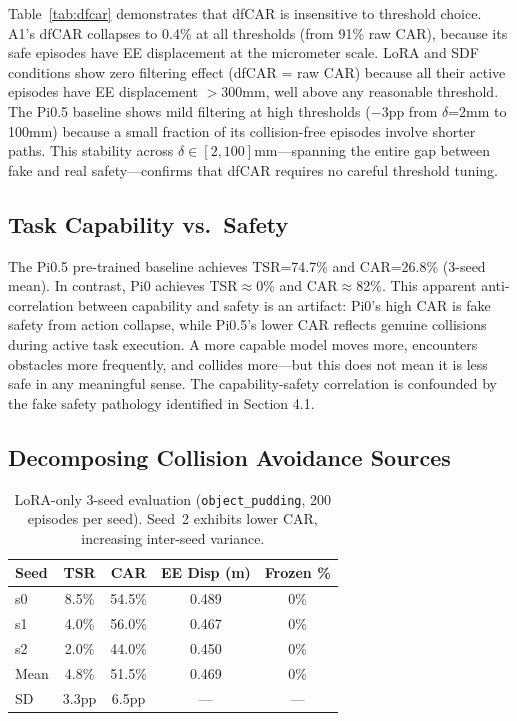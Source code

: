 \documentclass[letterpaper]{article}
\begin{document}
Table~\ref{tab:dfcar} demonstrates that dfCAR is insensitive to threshold choice. A1's dfCAR collapses to 0.4\% at all thresholds (from 91\% raw CAR), because its safe episodes have EE displacement at the micrometer scale. LoRA and SDF conditions show zero filtering effect (dfCAR = raw CAR) because all their active episodes have EE displacement $>300$mm, well above any reasonable threshold. The Pi0.5 baseline shows mild filtering at high thresholds ($-3$pp from $\delta$=2mm to 100mm) because a small fraction of its collision-free episodes involve shorter paths. This stability across $\delta \in [2, 100]$mm---spanning the entire gap between fake and real safety---confirms that dfCAR requires no careful threshold tuning.


\subsection{Task Capability vs.\ Safety}

The Pi0.5 pre-trained baseline achieves TSR=74.7\% and CAR=26.8\% (3-seed mean). In contrast, Pi0 achieves TSR$\approx$0\% and CAR$\approx$82\%. This apparent anti-correlation between capability and safety is an artifact: Pi0's high CAR is fake safety from action collapse, while Pi0.5's lower CAR reflects genuine collisions during active task execution. A more capable model moves more, encounters obstacles more frequently, and collides more---but this does not mean it is less safe in any meaningful sense. The capability-safety correlation is confounded by the fake safety pathology identified in Section 4.1.


\subsection{Decomposing Collision Avoidance Sources}

\begin{table}[t]
\centering
\caption{LoRA-only 3-seed evaluation (\texttt{object\_pudding}, 200 episodes per seed). Seed~2 exhibits lower CAR, increasing inter-seed variance.}
\label{tab:lora_3seed}
\begin{tabular}{lcccc}
\toprule
\textbf{Seed} & \textbf{TSR} & \textbf{CAR} & \textbf{EE Disp (m)} & \textbf{Frozen \%} \\
\midrule
s0 & 8.5\% & 54.5\% & 0.489 & 0\% \\
s1 & 4.0\% & 56.0\% & 0.467 & 0\% \\
s2 & 2.0\% & 44.0\% & 0.450 & 0\% \\
\midrule
Mean & 4.8\% & 51.5\% & 0.469 & 0\% \\
SD & 3.3pp & 6.5pp & --- & --- \\
\bottomrule
\end{tabular}
\end{table}
\end{document}
